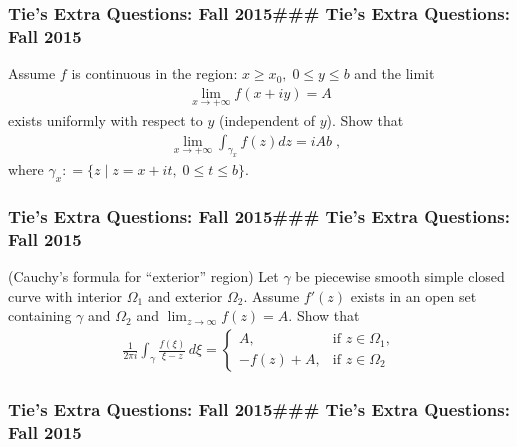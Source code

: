 \hypertarget{ties-extra-questions-fall-2015-ties-extra-questions-fall-2015-1}{%
\subsubsection{Tie's Extra Questions: Fall 2015\#\#\# Tie's Extra
Questions: Fall
2015}\label{ties-extra-questions-fall-2015-ties-extra-questions-fall-2015-1}}

Assume \(f\) is continuous in the region:
\(x \geq x_0, \; 0 \leq y \leq b\) and the limit
\begin{align*}\displaystyle \lim_{x \rightarrow + \infty} f(x + iy) = A\end{align*}
exists uniformly with respect to \(y\) (independent of \(y\)). Show that
\begin{align*}\lim_{x \rightarrow + \infty} \int_{\gamma_x} f(z) dz  = iA b \; , \; \;\end{align*}
where \(\gamma_x : = \{ z \; | \; z = x + it, \; 0 \leq t \leq b\}.\)

\hypertarget{ties-extra-questions-fall-2015-ties-extra-questions-fall-2015-2}{%
\subsubsection{Tie's Extra Questions: Fall 2015\#\#\# Tie's Extra
Questions: Fall
2015}\label{ties-extra-questions-fall-2015-ties-extra-questions-fall-2015-2}}

(Cauchy's formula for ``exterior'' region) Let \(\gamma\) be piecewise
smooth simple closed curve with interior \(\Omega_1\) and exterior
\(\Omega_2\). Assume \(f'(z)\) exists in an open set containing
\(\gamma\) and \(\Omega_2\) and
\(\lim_{z \rightarrow \infty } f(z) = A\). Show that
\begin{align*}\frac{1}{2 \pi i} \int_\gamma \frac{f(\xi)}{\xi - z} \, d \xi =
\begin{cases}
A,          &     \text{if\ $z \in \Omega_1$}, \\
-f (z) + A, &  \text{if\ $z \in \Omega_2$}
\end{cases}\end{align*}

\hypertarget{ties-extra-questions-fall-2015-ties-extra-questions-fall-2015-3}{%
\subsubsection{Tie's Extra Questions: Fall 2015\#\#\# Tie's Extra
Questions: Fall
2015}\label{ties-extra-questions-fall-2015-ties-extra-questions-fall-2015-3}}


